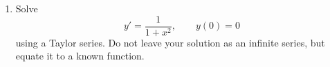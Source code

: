 \documentclass[12pt]{book}
\begin{document}
\begin{enumerate}
    
  \item
    Solve
    \begin{dmath*}[compact]
      y' = \frac{1}{1+x^2}, \qquad y(0)=0
    \end{dmath*}
    using a Taylor series. Do not leave your solution as an infinite series,
    but equate it to a known function.


\end{enumerate}
\end{document}
